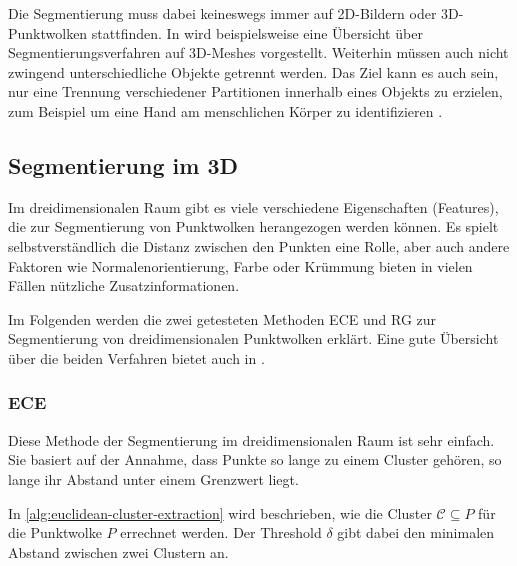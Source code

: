 Die Segmentierung muss dabei keineswegs immer auf 2D-Bildern oder 3D-Punktwolken stattfinden.
In \cite{shamir2008survey} wird beispielsweise eine Übersicht über Segmentierungsverfahren auf 3D-Meshes vorgestellt.
Weiterhin müssen auch nicht zwingend unterschiedliche Objekte getrennt werden.
Das Ziel kann es auch sein, nur eine Trennung verschiedener Partitionen innerhalb eines Objekts zu erzielen, zum Beispiel um eine Hand am menschlichen Körper zu identifizieren \cite{shapira2008consistent}.


\subsection{Segmentierung im 3D}
\label{subsec:3d-segmentation}

Im dreidimensionalen Raum gibt es viele verschiedene Eigenschaften (Features), die zur Segmentierung von Punktwolken herangezogen werden können.
Es spielt selbstverständlich die Distanz zwischen den Punkten eine Rolle, aber auch andere Faktoren wie Normalenorientierung, Farbe oder Krümmung bieten in vielen Fällen nützliche Zusatzinformationen.

Im Folgenden werden die zwei getesteten Methoden \ac{ECE} und \ac{RG} zur Segmentierung von dreidimensionalen Punktwolken erklärt.
Eine gute Übersicht über die beiden Verfahren bietet auch \citeauthor{RusuDoctoralDissertation} in \cite[88--93]{RusuDoctoralDissertation}.

\subsubsection{\acl{ECE}}
\label{subsubsec:euclidean-cluster-extraction}

Diese Methode der Segmentierung im dreidimensionalen Raum ist sehr einfach.
Sie basiert auf der Annahme, dass Punkte so lange zu einem Cluster gehören, so lange ihr Abstand unter einem Grenzwert liegt.

In \autoref{alg:euclidean-cluster-extraction} wird beschrieben, wie die Cluster $\mathcal{C} \subseteq P$ für die Punktwolke $P$ errechnet werden.
Der Threshold $\delta$ gibt dabei den minimalen Abstand zwischen zwei Clustern an.


